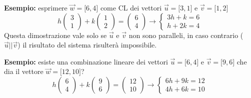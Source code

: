 \documentclass[../main.tex]{subfiles}
\begin{document}
\textbf{Esempio:} esprimere $\vec{w}= \lbrack6,4\rbrack$ come CL dei vettori $\vec{u}=\lbrack3,1\rbrack$ e $\vec{v}=\lbrack1,2\rbrack$
$$
    h \begin{pmatrix}
        3 \\
        1
    \end{pmatrix}
    +k \begin{pmatrix}
        1 \\
        2
    \end{pmatrix}
    = \begin{pmatrix}
       6 \\
       4
    \end{pmatrix} \rightarrow
    \begin{cases}
        3h+k=6 \\
        h+2k=4
    \end{cases}
$$
Questa dimostrazione vale solo se $\vec{u}$ e $\vec{v}$ non sono paralleli, in caso contrario ($\vec{u} || \vec{v}$) il risultato del sistema risulterà impossibile.

\pagebreak
\textbf{Esempio:} esiste una combinazione lineare dei vettori $\vec{u}= \lbrack6,4\rbrack$ e $\vec{v}= \lbrack9,6\rbrack$ che dia il vettore $\vec{w}= \lbrack12,10\rbrack$?
$$
    h \begin{pmatrix}
        6 \\
        4
    \end{pmatrix}
    +k \begin{pmatrix}
        9 \\
        6
    \end{pmatrix}
    = \begin{pmatrix}
       12 \\
       10
    \end{pmatrix} \rightarrow
    \begin{cases}
        6h+9k=12 \\
        4h+6k=10
    \end{cases}
$$
\end{document}
